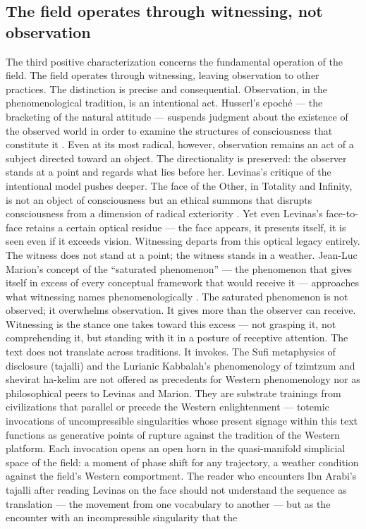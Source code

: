 \subsection{The field operates through witnessing, not observation}

The third positive characterization concerns the fundamental operation of the field. The field operates through witnessing, leaving observation to other practices. The distinction is precise and consequential. Observation, in the phenomenological tradition, is an intentional act. Husserl’s epoché — the bracketing of the natural attitude — suspends judgment about the existence of the observed world in order to examine the structures of consciousness that constitute it \cite{husserl_1913}. Even at its most radical, however, observation remains an act of a subject directed toward an object. The directionality is preserved: the observer stands at a point and regards what lies before her. Levinas’s critique of the intentional model pushes deeper. The face of the Other, in Totality and Infinity, is not an object of consciousness but an ethical summons that disrupts consciousness from a dimension of radical exteriority \cite{levinas_1961}. Yet even Levinas’s face-to-face retains a certain optical residue — the face appears, it presents itself, it is seen even if it exceeds vision. Witnessing departs from this optical legacy entirely. The witness does not stand at a point; the witness stands in a weather. Jean-Luc Marion’s concept of the “saturated phenomenon” — the phenomenon that gives itself in excess of every conceptual framework that would receive it — approaches what witnessing names phenomenologically \cite{marion_1997}. The saturated phenomenon is not observed; it overwhelms observation. It gives more than the observer can receive. Witnessing is the stance one takes toward this excess — not grasping it, not comprehending it, but standing with it in a posture of receptive attention. The text does not translate across traditions. It invokes. The Sufi metaphysics of disclosure (tajalli) and the Lurianic Kabbalah’s phenomenology of tzimtzum and shevirat ha-kelim are not offered as precedents for Western phenomenology nor as philosophical peers to Levinas and Marion. They are substrate trainings from civilizations that parallel or precede the Western enlightenment — totemic invocations of uncompressible singularities whose present signage within this text functions as generative points of rupture against the tradition of the Western platform. Each invocation opens an open horn in the quasi-manifold simplicial space of the field: a moment of phase shift for any trajectory, a weather condition against the field’s Western comportment. The reader who encounters Ibn Arabi’s tajalli after reading Levinas on the face should not understand the sequence as translation — the movement from one vocabulary to another — but as the encounter with an incompressible singularity that the

